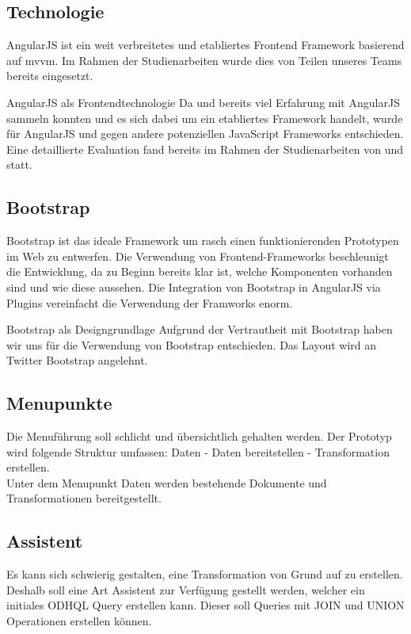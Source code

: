 \subsection{Technologie}
AngularJS ist ein weit verbreitetes und etabliertes Frontend Framework basierend auf \acs{mvvm}. Im Rahmen der Studienarbeiten wurde dies von Teilen unseres Teams bereits eingesetzt.

\begin{decision}[label=dec:frontend:technology]{AngularJS als Frontendtechnologie}
Da \chuf und \fscf bereits viel Erfahrung mit AngularJS sammeln konnten und es sich dabei um ein etabliertes Framework handelt, wurde für AngularJS und gegen andere potenziellen JavaScript Frameworks entschieden. Eine detaillierte Evaluation fand bereits im Rahmen der Studienarbeiten von \fscf und \rlif statt.
\end{decision}

\subsection{Bootstrap}
Bootstrap ist das ideale Framework um rasch einen funktionierenden Prototypen im Web zu entwerfen. Die Verwendung von Frontend-Frameworks beschleunigt die Entwicklung, da zu Beginn bereits klar ist, welche Komponenten vorhanden sind und wie diese aussehen. Die Integration von Bootstrap in AngularJS via Plugins vereinfacht die Verwendung der Framworks enorm.
\begin{decision}[label=dec:frontend:bootstrap]{Bootstrap als Designgrundlage}
Aufgrund der Vertrautheit mit Bootstrap haben wir uns für die Verwendung von Bootstrap entschieden. Das Layout wird an Twitter Bootstrap angelehnt.
\end{decision}

\subsection{Menupunkte}
Die Menuführung soll schlicht und übersichtlich gehalten werden. Der Prototyp wird folgende Struktur umfassen: Daten - Daten bereitstellen - Transformation erstellen. \\
Unter dem Menupunkt Daten werden bestehende Dokumente und Transformationen bereitgestellt.\\

\subsection{Assistent}
Es kann sich schwierig gestalten, eine Transformation von Grund auf zu erstellen. Deshalb soll eine Art Assistent zur Verfügung gestellt werden, welcher ein initiales ODHQL Query erstellen kann. Dieser soll Queries mit JOIN und UNION Operationen erstellen können.

